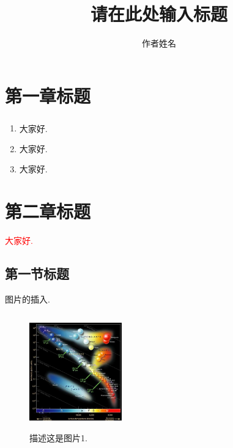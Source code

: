 \documentclass[UTF8, a4paper]{ctexart}
\title{{\Huge 请在此处输入标题}}
\author{作者姓名}
\numberwithin{equation}{section} %
\newcommand{\tcr}{\textcolor{blue}} %
\newcommand{\upcite}[1]{\textsuperscript{\textsuperscript{\tcr{\cite{#1}}}}}
\begin{document}
\maketitle

\tableofcontents %
\newpage



\section{第一章标题}

	\begin{enumerate}
	\item 大家好\upcite{ref1}.

	\item 大家好\cite{ref1,ref2}.

	\item 大家好.
	\end{enumerate}

\section{第二章标题}

	\textcolor{red}{大家好.}

	\subsection{第一节标题}

		图片的插入.

		\begin{figure}[h]
			\centering
			\label{fig1}
			\includegraphics[width=4cm,height=5cm]{2-1.png}
			\caption{描述这是图片1.}
		\end{figure}
\end{document}
